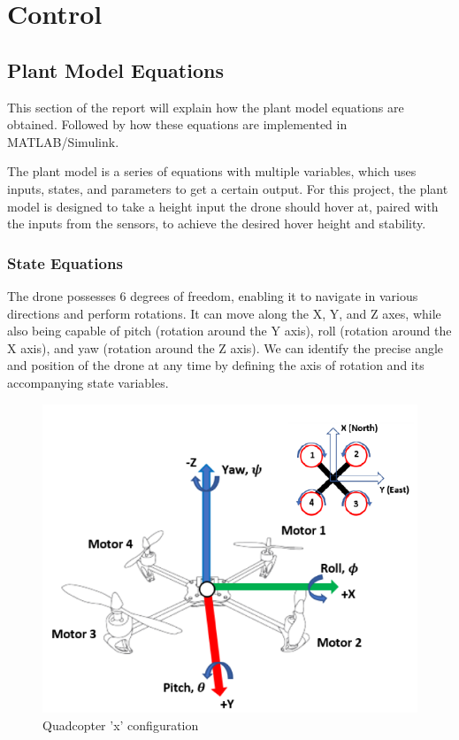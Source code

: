 \section{Control}
\subsection{Plant Model Equations}
This section of the report will explain how the plant model equations are obtained. Followed by how these equations are implemented in MATLAB/Simulink.

The plant model is a series of equations with multiple variables, which uses inputs, states, and parameters to get a certain output. 
For this project, the plant model is designed to take a height input the drone should hover at, paired with the inputs from the sensors, to achieve the desired hover height and stability.

\subsubsection{State Equations}
The drone possesses 6 degrees of freedom, enabling it to navigate in various directions and perform rotations. It can move along the X, Y, and Z axes, while also being capable of pitch (rotation around the Y axis), roll (rotation around the X axis), and yaw (rotation around the Z axis). We can identify the precise angle and position of the drone at any time by defining the axis of rotation and its accompanying state variables.
\cite{Ferry}

\begin{figure}[H]
\begin{center}
    \includegraphics[scale =0.7]{pictures/control/drone directionals.png}
\end{center}
\caption{Quadcopter 'x' configuration}
\end{figure}

